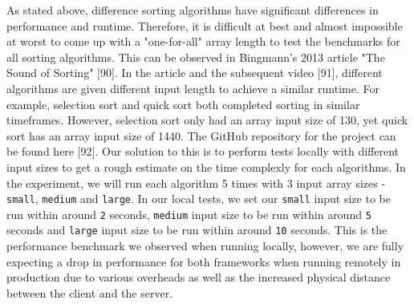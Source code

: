 As stated above, difference sorting algorithms have significant differences in performance and runtime. Therefore, it is difficult at best and almost impossible at worst to come up with a "one-for-all" array length to test the benchmarks for all sorting algorithms. This can be observed in Bingmann's 2013 article "The Sound of Sorting" [90]. In the article and the subsequent video [91], different algorithms are given different input length to achieve a similar runtime. For example, selection sort and quick sort both completed sorting in similar timeframes. However, selection sort only had an array input size of 130, yet quick sort has an array input size of 1440. The GitHub repository for the project can be found here [92]. Our solution to this is to perform tests locally with different input sizes to get a rough estimate on the time complexly for each algorithms. In the experiment, we will run each algorithm 5 times with 3 input array sizes - \texttt{small}, \texttt{medium} and \texttt{large}. In our local tests, we set our \texttt{small} input size to be run within around \texttt{2} seconds, \texttt{medium} input size to be run within around \texttt{5} seconds and \texttt{large} input size to be run within around \texttt{10} seconds. This is the performance benchmark we observed when running locally, however, we are fully expecting a drop in performance for both frameworks when running remotely in production due to various overheads as well as the increased physical distance between the client and the server.

